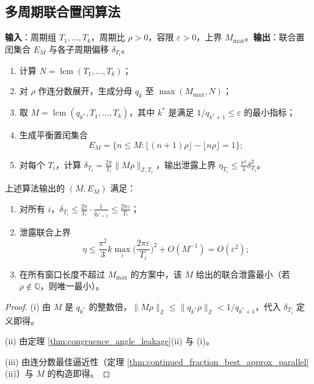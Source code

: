 \subsection{多周期联合置闰算法}

\begin{definition}[多周期联合置闰算法]\label{def:multi_period_intercalation_algorithm}
\textbf{输入}：周期组 $T_1,\dots,T_k$，周期比 $\rho>0$，容限 $\varepsilon>0$，上界 $M_{\max}$。\textbf{输出}：联合置闰集合 $E_M$ 与各子周期偏移 $\delta_{T_i}$。
\begin{enumerate}[label=\textbf{步骤 \arabic*.}]
    \item 计算 $N=\operatorname{lcm}(T_1,\dots,T_k)$；
    \item 对 $\rho$ 作连分数展开，生成分母 $q_k$ 至 $\max(M_{\max},N)$；
    \item 取 $M=\operatorname{lcm}(q_{k^\ast},T_1,\dots,T_k)$，其中 $k^\ast$ 是满足 $1/q_{k^\ast+1}\le\varepsilon$ 的最小指标；
    \item 生成平衡置闰集合
    \[
    E_M=\{n\le M:\lfloor(n+1)\rho\rfloor-\lfloor n\rho\rfloor=1\};
    \]
    \item 对每个 $T_i$，计算 $\delta_{T_i}=\frac{2\pi}{T_i}\|M\rho\|_{\mathbb{Z},T_i}$，输出泄露上界 $\eta_{T_i}\le\frac{\pi^2}{3}\delta_{T_i}^2$。
\end{enumerate}
\end{definition}

\begin{theorem}[多周期联合置闰的正确性与最优性]\label{thm:multi_period_intercalation_correctness}
上述算法输出的 $(M,E_M)$ 满足：
\begin{enumerate}[label=(\roman*)]
    \item 对所有 $i$，$\delta_{T_i}\le\frac{2\pi}{T_i}\cdot\frac{1}{q_{k^\ast+1}}\le\frac{2\pi\varepsilon}{T_i}$；
    \item 泄露联合上界
    \[
    \eta\le\frac{\pi^2}{3}k\max_i\Big(\frac{2\pi\varepsilon}{T_i}\Big)^2+O(M^{-1})=O(\varepsilon^2);
    \]
    \item 在所有窗口长度不超过 $M_{\max}$ 的方案中，该 $M$ 给出的联合泄露最小（若 $\rho\notin\mathbb{Q}$，则唯一最小）。
\end{enumerate}
\end{theorem}

\begin{proof}
(i) 由 $M$ 是 $q_{k^\ast}$ 的整数倍，$\|M\rho\|_{\mathbb{Z}}\le\|q_{k^\ast}\rho\|_{\mathbb{Z}}<1/q_{k^\ast+1}$，代入 $\delta_{T_i}$ 定义即得。

(ii) 由定理 \ref{thm:congruence_angle_leakage}(ii) 与 (i)。

(iii) 由连分数最佳逼近性（定理 \ref{thm:continued_fraction_best_approx_parallel}(ii)）与 $M$ 的构造即得。
\end{proof}

